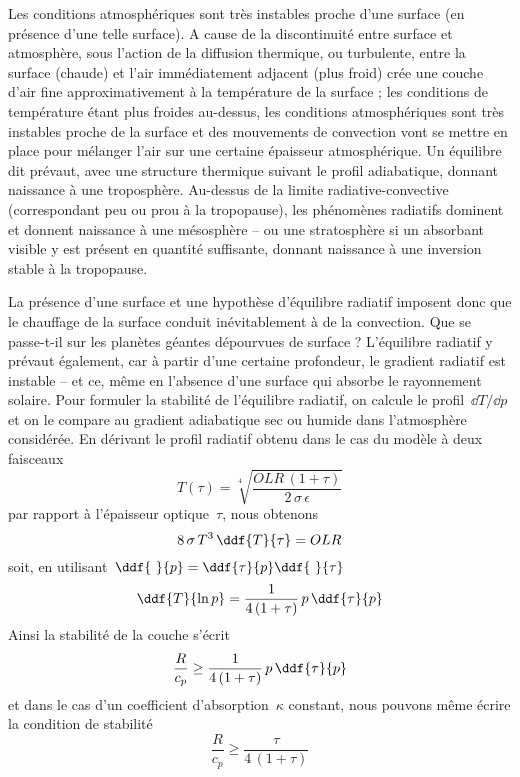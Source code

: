 \sk
Les conditions atmosphériques sont très instables proche d'une surface (en présence d'une telle surface). A cause de la discontinuité entre surface et atmosphère, sous l'action de la diffusion thermique, ou turbulente, entre la surface (chaude) et l'air immédiatement adjacent (plus froid) crée une couche d'air fine approximativement à la température de la surface ; les conditions de température étant plus froides au-dessus, les conditions atmosphériques sont très instables proche de la surface et des mouvements de convection vont se mettre en place pour mélanger l'air sur une certaine épaisseur atmosphérique. Un équilibre dit  prévaut, avec une structure thermique suivant le profil adiabatique, donnant naissance à une troposphère. Au-dessus de la limite radiative-convective (correspondant peu ou prou à la tropopause), les phénomènes radiatifs dominent et donnent naissance à une mésosphère -- ou une stratosphère si un absorbant visible y est présent en quantité suffisante, donnant naissance à une inversion stable à la tropopause.

\sk
La présence d'une surface et une hypothèse d'équilibre radiatif imposent donc que le chauffage de la surface conduit inévitablement à de la convection. Que se passe-t-il sur les planètes géantes dépourvues de surface ? L'équilibre radiatif y prévaut également, car à partir d'une certaine profondeur, le gradient radiatif est instable -- et ce, même en l'absence d'une surface qui absorbe le rayonnement solaire. Pour formuler la stabilité de l'équilibre radiatif, on calcule le profil~$\dd T / \dd p$ et on le compare au gradient adiabatique sec ou humide dans l'atmosphère considérée. En dérivant le profil radiatif obtenu dans le cas du modèle à deux faisceaux
\[ T(\tau) = \sqrt[4]{\frac{OLR\,(1+\tau)}{2\,\sigma\,\epsilon}} \]
\noindent par rapport à l'épaisseur optique~$\tau$, nous obtenons
\[ 8 \, \sigma \, T^3 \, \ddf{T}{\tau} = OLR \]
\noindent soit, en utilisant~$\ddf{~}{p} = \ddf{\tau}{p} \ddf{~}{\tau}$
\[ \ddf{T}{\ln p} = \frac{1}{4\,(1+\tau)} \, p \, \ddf{\tau}{p} \]
Ainsi la stabilité de la couche s'écrit
\[ \frac{R}{c_p} \ge \frac{1}{4\,(1+\tau)} \, p \, \ddf{\tau}{p} \]
\noindent et dans le cas d'un coefficient d'absorption~$\kappa$ constant, nous pouvons même écrire la condition de stabilité
\[ \frac{R}{c_p} \ge \frac{\tau}{4\,(1+\tau)} \]

